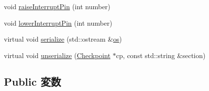 \begin{DoxyCompactItemize}
\item 
void \hyperlink{classX86ISA_1_1I82094AA_ac26dfa4264d910f3ef50015beafea211}{raiseInterruptPin} (int number)
\item 
void \hyperlink{classX86ISA_1_1I82094AA_a41406df644356ee1578b77b1acd18042}{lowerInterruptPin} (int number)
\item 
virtual void \hyperlink{classX86ISA_1_1I82094AA_a53e036786d17361be4c7320d39c99b84}{serialize} (std::ostream \&\hyperlink{namespaceX86ISA_a6b6e6ba763e7eaf46ac5b6372ca98d30}{os})
\item 
virtual void \hyperlink{classX86ISA_1_1I82094AA_af22e5d6d660b97db37003ac61ac4ee49}{unserialize} (\hyperlink{classCheckpoint}{Checkpoint} $\ast$cp, const std::string \&section)
\end{DoxyCompactItemize}
\subsection*{Public 変数}
